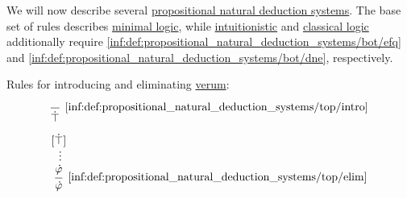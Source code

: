 \begin{definition}\label{def:propositional_natural_deduction_systems}
  We will now describe several \hyperref[def:propositional_natural_deduction_system]{propositional natural deduction systems}. The base set of rules describes \hyperref[def:minimal_logic]{minimal logic}, while \hyperref[def:intuitionistic_logic]{intuitionistic} and \hyperref[def:classical_logic]{classical logic} additionally require \ref{inf:def:propositional_natural_deduction_systems/bot/efq} and \ref{inf:def:propositional_natural_deduction_systems/bot/dne}, respectively.

  \begin{thmenum}
    \mimprovised Rules for introducing and eliminating \hyperref[def:propositional_alphabet/constants/verum]{verum}:
    \begin{paracol}{2}
      \begin{leftcolumn}
        \leavevmode\vfill
        \begin{equation*}\taglabel[\ensuremath{ \top^+ }]{inf:def:propositional_natural_deduction_systems/top/intro}
          \begin{prooftree}
            \infer0[\ref{inf:def:propositional_natural_deduction_systems/top/intro}]{ \syntop }
          \end{prooftree}
        \end{equation*}
      \end{leftcolumn}

      \begin{rightcolumn}
        \leavevmode\vfill
        \begin{equation*}\taglabel[\ensuremath{ \top^- }]{inf:def:propositional_natural_deduction_systems/top/elim}
          \begin{prooftree}
            \hypo{ [\syntop] }
            \ellipsis {} { \syn\varphi }
            \infer1[\ref{inf:def:propositional_natural_deduction_systems/top/elim}]{ \syn\varphi }
          \end{prooftree}
        \end{equation*}
      \end{rightcolumn}
    \end{paracol}


\end{thmenum}
\end{definition}
